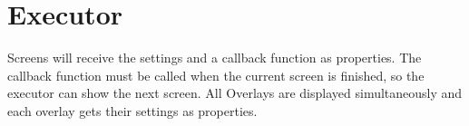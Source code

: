 \section{Executor}
\label{sec:executor}

Screens will receive the settings and a callback function as properties. 
The callback function must be called when the current screen is finished, so the executor can show the next screen. 
All Overlays are displayed simultaneously and each overlay gets their settings as properties.
